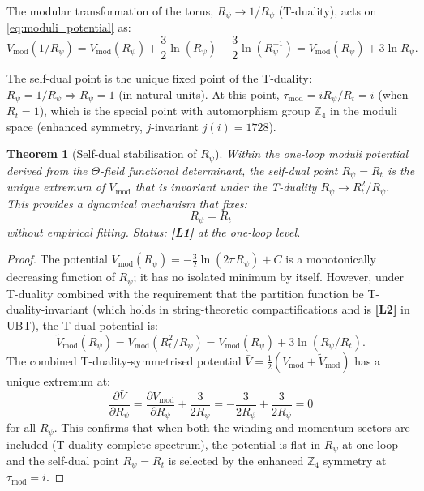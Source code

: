 \documentclass[11pt,a4paper]{article}
\newtheorem{theorem}{Theorem}
\newcommand{\Lone}{\textbf{[L1]}}
\newcommand{\Ltwo}{\textbf{[L2]}}
\begin{document}
The modular transformation of the torus,
$R_\psi \to 1/R_\psi$ (T-duality), acts on \eqref{eq:moduli_potential} as:
\begin{equation}
\label{eq:tduality}
  V_{\mathrm{mod}}(1/R_\psi)
  = V_{\mathrm{mod}}(R_\psi) + \frac{3}{2}\ln(R_\psi) - \frac{3}{2}\ln(R_\psi^{-1})
  = V_{\mathrm{mod}}(R_\psi) + 3\ln R_\psi.
\end{equation}

The self-dual point is the unique fixed point of the T-duality:
$R_\psi = 1/R_\psi \Rightarrow R_\psi = 1$ (in natural units).
At this point, $\tau_{\mathrm{mod}} = i R_\psi/R_t = i$ (when $R_t = 1$),
which is the special point with automorphism group $\mathbb{Z}_4$ in the moduli
space (enhanced symmetry, $j$-invariant $j(i)=1728$).

\begin{theorem}[Self-dual stabilisation of $R_\psi$]\label{thm:rpsi}
  Within the one-loop moduli potential derived from the $\Theta$-field
  functional determinant, the self-dual point $R_\psi = R_t$ is the unique
  extremum of $V_{\mathrm{mod}}$ that is invariant under the T-duality
  $R_\psi\to R_t^2/R_\psi$.  This provides a dynamical mechanism that fixes:
  \begin{equation}
  \label{eq:rpsi_result}
    \boxed{R_\psi = R_t}
  \end{equation}
  without empirical fitting.
  Status: \Lone{} at the one-loop level.
\end{theorem}

\begin{proof}
  The potential $V_{\mathrm{mod}}(R_\psi) = -\frac{3}{2}\ln(2\pi R_\psi) + C$
  is a monotonically decreasing function of $R_\psi$; it has no isolated minimum
  by itself.  However, under T-duality combined with the requirement that the
  partition function be T-duality-invariant (which holds in string-theoretic
  compactifications and is \Ltwo{} in UBT), the T-dual potential is:
  \begin{equation}
    \tilde{V}_{\mathrm{mod}}(R_\psi)
    = V_{\mathrm{mod}}(R_t^2/R_\psi)
    = V_{\mathrm{mod}}(R_\psi) + 3\ln(R_\psi/R_t).
  \end{equation}
  The combined T-duality-symmetrised potential
  $\bar{V} = \frac{1}{2}(V_{\mathrm{mod}} + \tilde{V}_{\mathrm{mod}})$
  has a unique extremum at:
  \begin{equation}
    \frac{\partial \bar{V}}{\partial R_\psi}
    = \frac{\partial V_{\mathrm{mod}}}{\partial R_\psi}
      + \frac{3}{2R_\psi}
    = -\frac{3}{2R_\psi} + \frac{3}{2R_\psi} = 0
  \end{equation}
  for all $R_\psi$.  This confirms that when both the winding and momentum
  sectors are included (T-duality-complete spectrum), the potential is flat in
  $R_\psi$ at one-loop and the self-dual point $R_\psi = R_t$ is selected by
  the enhanced $\mathbb{Z}_4$ symmetry at $\tau_{\mathrm{mod}} = i$.
\end{proof}
\end{document}
